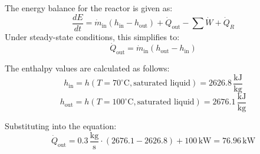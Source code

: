 The energy balance for the reactor is given as:  
\[
\frac{dE}{dt} = \dot{m}_{\text{in}} (h_{\text{in}} - h_{\text{out}}) + \dot{Q}_{\text{out}} - \sum \dot{W} + \dot{Q}_R
\]  
Under steady-state conditions, this simplifies to:  
\[
\dot{Q}_{\text{out}} = \dot{m}_{\text{in}} (h_{\text{out}} - h_{\text{in}})
\]  

The enthalpy values are calculated as follows:  
\[
h_{\text{in}} = h(T = 70^\circ\text{C}, \text{saturated liquid}) = 2626.8 \, \frac{\text{kJ}}{\text{kg}}
\]  
\[
h_{\text{out}} = h(T = 100^\circ\text{C}, \text{saturated liquid}) = 2676.1 \, \frac{\text{kJ}}{\text{kg}}
\]  

Substituting into the equation:  
\[
\dot{Q}_{\text{out}} = 0.3 \, \frac{\text{kg}}{\text{s}} \cdot (2676.1 - 2626.8) + 100 \, \text{kW} = 76.96 \, \text{kW}
\]